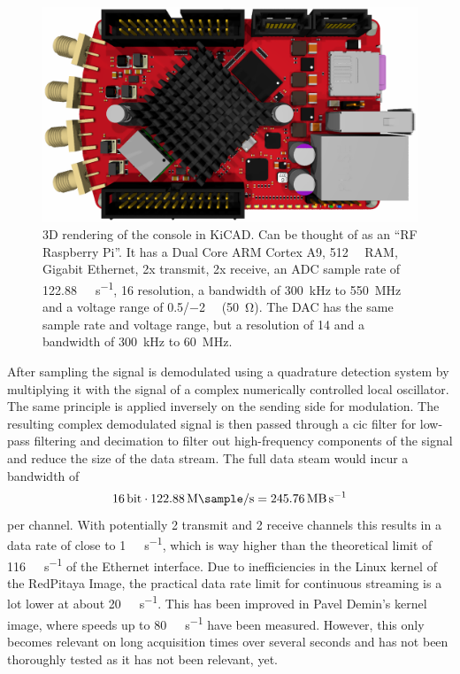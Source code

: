 \begin{figure}[hbt]
    \centering
    \includegraphics{images/rp122-16.png}
    \caption{ 3D rendering of the console in KiCAD. Can be thought of as an \enquote{RF Raspberry Pi}. It has a Dual Core ARM Cortex A9, \qty{512}{\mega\byte} RAM, Gigabit Ethernet, 2x transmit, 2x receive, an ADC sample rate of \qty{122.88}{\mega\sample\per\second}, \qty{16}{\bit} resolution, a bandwidth of \qty{300}{\kilo\hertz} to \qty{550}{\mega\hertz} and a voltage range of \qty{0.5}{\vpp}/\qty{-2}{\deci\belm} (\qty{50}{\ohm}). The DAC has the same sample rate and voltage range, but a resolution of \qty{14}{\bit} and a bandwidth of \qty{300}{\kilo\hertz} to \qty{60}{\mega\hertz}.}
\end{figure}

After sampling the signal is demodulated using a quadrature detection system by multiplying it with the signal of a complex numerically controlled local oscillator. The same principle is applied inversely on the sending side for modulation. The resulting complex demodulated signal is then passed through a \acrfull{cic} filter for low-pass filtering and decimation to filter out high-frequency components of the signal and reduce the size of the data stream. The full data steam would incur a bandwidth of
\[
    \qty{16}{\bit} \cdot \qty{122.88}{\mega\sample\per\second} = \qty{245.76}{\mega\byte\per\second}
\]
per channel. With potentially 2 transmit and 2 receive channels this results in a data rate of close to \qty{1}{\giga\byte\per\second}, which is way higher than the theoretical limit of \qty{116}{\mega\byte\per\second} of the Ethernet interface. Due to inefficiencies in the Linux kernel of the RedPitaya Image, the practical data rate limit for continuous streaming is a lot lower at about \qty{20}{\mega\sample\per\second}. This has been improved in Pavel Demin's kernel image, where speeds up to \qty{80}{\mega\byte\per\second} have been measured. However, this only becomes relevant on long acquisition times over several seconds and has not been thoroughly tested as it has not been relevant, yet.

